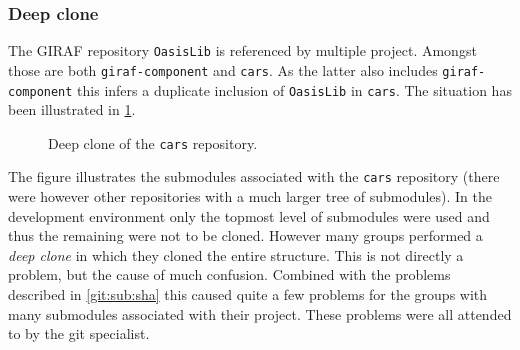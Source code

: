\subsubsection{Deep clone}\label{git:sub:deep}
The GIRAF repository \texttt{OasisLib} is referenced by multiple project.
Amongst those are both \texttt{giraf-component} and \texttt{cars}.
As the latter also includes \texttt{giraf-component} this infers a duplicate inclusion of \texttt{OasisLib} in \texttt{cars}.
The situation has been illustrated in \cref{git:sub:clonefig}.
\begin{figure}[h]
\centering
{}
\caption{Deep clone of the \texttt{cars} repository.}
\label{git:sub:clonefig}
\end{figure}
The figure illustrates the submodules associated with the \texttt{cars} repository (there were however other repositories with a much larger tree of submodules).
In the development environment only the topmost level of submodules were used and thus the remaining were not to be cloned.
However many groups performed a \textit{deep clone} in which they cloned the entire structure.
This is not directly a problem, but the cause of much confusion.
Combined with the problems described in \cref{git:sub:sha} this caused quite a few problems for the groups with many submodules associated with their project.
These problems were all attended to by the git specialist.